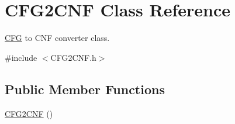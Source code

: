 \hypertarget{class_c_f_g2_c_n_f}{\section{\-C\-F\-G2\-C\-N\-F \-Class \-Reference}
\label{class_c_f_g2_c_n_f}
}


\hyperlink{class_c_f_g}{\-C\-F\-G} to \-C\-N\-F converter class.  




{\ttfamily \#include $<$\-C\-F\-G2\-C\-N\-F.\-h$>$}

\subsection*{\-Public \-Member \-Functions}
\begin{DoxyCompactItemize}
\item 
\hypertarget{class_c_f_g2_c_n_f_aa26a18174556859f70ac9454cd431147}{\hyperlink{class_c_f_g2_c_n_f_aa26a18174556859f70ac9454cd431147}{\-C\-F\-G2\-C\-N\-F} ()}\label{class_c_f_g2_c_n_f_aa26a18174556859f70ac9454cd431147}


\end{DoxyCompactItemize}
